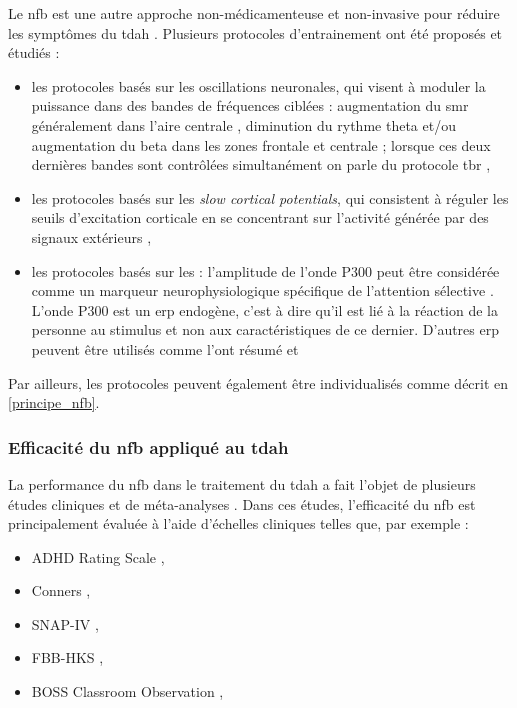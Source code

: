 Le \gls{nfb} est une autre approche non-médicamenteuse et non-invasive pour réduire les symptômes du \gls{tdah} \citep{Arns2015, Marzbani2016}.  
Plusieurs protocoles d'entrainement ont été proposés et étudiés :
\begin{itemize}
\item les protocoles basés sur les oscillations neuronales, qui visent à moduler la puissance dans des bandes de fréquences ciblées : augmentation du 
\gls{smr} généralement dans l'aire centrale \citep{Beauregard2006}, diminution du rythme theta et/ou augmentation du beta dans les 
zones frontale et centrale \citep{Arns2015, Kropotov2005} ; lorsque ces deux dernières bandes sont contrôlées simultanément on parle du protocole 
\gls{tbr} \citep{Lubar1976, Arns2013}, 
\item les protocoles basés sur les \textit{slow cortical potentials}, qui consistent à réguler les seuils d'excitation corticale en se concentrant sur l'activité 
générée par des signaux extérieurs \citep{Heinrich2004, Banaschewski2007},
\item les protocoles basés sur les  : l'amplitude de l'onde P300 peut être considérée comme un marqueur neurophysiologique spécifique de l'attention 
sélective \citep{Desain2012, Fouillen2017}. L'onde P300 est un \gls{erp} endogène, c'est à dire qu'il est lié à la réaction de la personne au stimulus et non aux 
caractéristiques de ce dernier. D'autres \gls{erp} peuvent être utilisés comme l'ont résumé \citet{Johnstone2013} et \citet{Barry2003erp}
\end{itemize}

Par ailleurs, les protocoles peuvent également être individualisés comme décrit en \ref{principe_nfb}.

\subsubsection{Efficacité du \gls{nfb} appliqué au \gls{tdah}}

La performance du \gls{nfb} dans le traitement du \gls{tdah} a fait l'objet de plusieurs études cliniques \citep{Escolano2014, Maurizio2014, Strehl2017} 
et de méta-analyses \citep{Arns2009, Arns2013, Sonuga-Barke2013, Micoulaud2014, Cortese2016, Catala2017, Lambez2019}. Dans ces études, l'efficacité du \gls{nfb} est 
principalement évaluée à l'aide d'échelles cliniques telles que, par exemple :
\begin{itemize}
\item ADHD Rating Scale \citep{Pappas2006},
\item Conners \citep{Conners2008},
\item SNAP-IV \citep{Bussing2008},
\item FBB-HKS \citep{Breuer2009},
\item BOSS Classroom Observation \citep{Shapiro2010}, 
\end{itemize}

